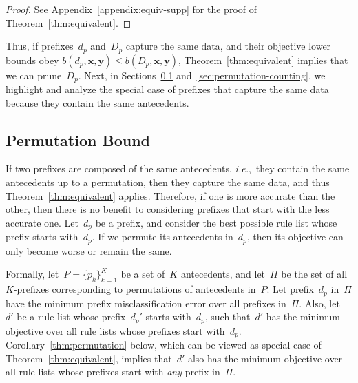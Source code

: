 \documentclass[twoside,11pt]{article}
\def\ie{{\it i.e.},~}
\newcommand{\x}{\mathbf{x}}
\newcommand{\y}{\mathbf{y}}
\def\RL{{d}}
\def\Prefix{d_p}
\def\PrefixB{D_p}
\begin{document}
\begin{arxiv}
\begin{proof}
See Appendix~\ref{appendix:equiv-supp} for the proof of Theorem~\ref{thm:equivalent}.
\end{proof}
\end{arxiv}

Thus, if prefixes~$\Prefix$ and~$\PrefixB$ capture the same data,
and their objective lower bounds obey
${b(\Prefix, \x, \y) \le b(\PrefixB, \x, \y)}$,
Theorem~\ref{thm:equivalent} implies that we can prune~$\PrefixB$.
%
%
Next, in Sections~\ref{sec:permutation} and~\ref{sec:permutation-counting},
we highlight and analyze the special case of prefixes that capture
the same data because they contain the same antecedents.

\subsection{Permutation Bound}%
\label{sec:permutation}

If two prefixes are composed of the same antecedents,
\ie they contain the same antecedents up to a permutation,
then they capture the same data, and thus Theorem~\ref{thm:equivalent} applies.
%
Therefore, if one is more accurate than the other, then there is no benefit to
considering prefixes that start with the less accurate one.
%
Let~$\Prefix$ be a prefix,
and consider the best possible rule list whose prefix starts with~$\Prefix$.
%
If we permute its antecedents in~$\Prefix$,
then its objective can only become worse or remain the same.

Formally, let~${P = \{p_k\}_{k=1}^K}$ be a set of~$K$ antecedents,
and let~$\Pi$ be the set of all $K$-prefixes corresponding to
permutations of antecedents in~$P$.
%
Let prefix~$\Prefix$ in~$\Pi$ have the minimum prefix misclassification
error over all prefixes in~$\Pi$.
%
Also, let~$\RL'$ be a rule list whose prefix~$\Prefix'$
starts with~$\Prefix$, such that~$\RL'$ has the minimum objective
over all rule lists whose prefixes start with~$\Prefix$.
%
Corollary~\ref{thm:permutation} below,
which can be viewed as special case of Theorem~\ref{thm:equivalent},
implies that~$\RL'$ also has the minimum objective over all
rule lists whose prefixes start with \emph{any} prefix in~$\Pi$.
\end{document}
